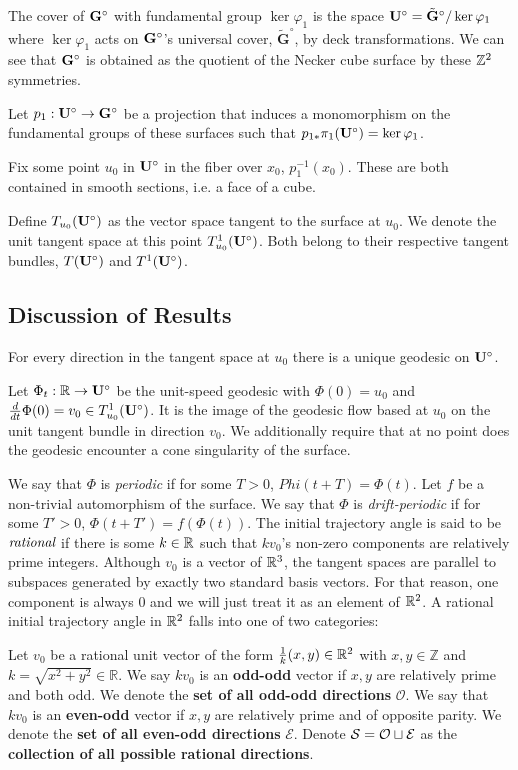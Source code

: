 \documentclass[a4paper, 11pt]{article}
\begin{document}
The cover of $\mathbf{G}^\circ$ with fundamental group $\ker\varphi_1$ is the space $\mathbf{U}^\circ=\tilde{\mathbf{G}}^\circ/\ker\varphi_1$ where $\ker\varphi_1$ acts on $\mathbf{G}^\circ$'s universal cover,  $\widetilde{\mathbf{G}}^\circ$, by deck transformations. We can see that $\mathbf{G}^\circ$ is obtained as the quotient of the Necker cube surface by these $\mathbb{Z}^2$ symmetries. 

\begin{Def}
Let $p_1:\mathbf{U}^\circ\rightarrow\mathbf{G}^\circ$ be a projection that induces a monomorphism on the fundamental groups of these surfaces such that $p_{1*}\pi_1(\mathbf{U}^\circ)=\ker\varphi_1$.
\end{Def}
Fix some point $u_0$ in $\mathbf{U}^\circ$ in the fiber over $x_0$, $p_1^{-1}(x_0)$. These are both contained in smooth sections, i.e. a face of a cube.
\begin{Def}
Define $T_{u_0}(\mathbf{U}^\circ)$ as the vector space tangent to the surface at $u_0$. We denote the unit tangent space at this point $T^1_{u_0}(\mathbf{U}^\circ)$. Both belong to their respective tangent bundles, $T(\mathbf{U}^\circ)$ and $T^1(\mathbf{U}^\circ)$.
\end{Def}

\subsection{Discussion of Results}
For every direction in the tangent space at $u_0$ there is a unique geodesic on $\mathbf{U}^\circ$.
\begin{Def}
Let $\Phi_t:\mathbb{R}\rightarrow\mathbf{U}^\circ$ be the unit-speed geodesic with $\Phi(0)=u_0$ and $\frac{d}{dt}\Phi(0)=v_0\in T^1_{u_0}(\mathbf{U}^\circ)$. It is the image of the geodesic flow based at $u_0$ on the unit tangent bundle in direction $v_0$. We additionally require that at no point does the geodesic encounter a cone singularity of the surface.
\end{Def}
We say that $\Phi$ is \emph{periodic} if for some $T>0$, $Phi(t+T)=\Phi(t)$. Let $f$ be a non-trivial automorphism of the surface. We say that $\Phi$ is \emph{drift-periodic} if for some $T'>0$, $\Phi(t+T')=f(\Phi(t))$. The initial trajectory angle is said to be $\emph{rational}$ if there is some $k\in\mathbb{R}$ such that $kv_0$'s non-zero components are relatively prime integers. Although $v_0$ is a vector of $\mathbb{R}^3$, the tangent spaces are parallel to subspaces generated by exactly two standard basis vectors. For that reason, one component is always 0 and we will just treat it as an element of $\mathbb{R}^2$. A rational initial trajectory angle in $\mathbb{R}^2$ falls into one of two categories:
\begin{Def}
Let $v_0$ be a rational unit vector of the form $\frac{1}{k}(x,y)\in\mathbb{R}^2$ with $x,y\in\mathbb{Z}$ and $k=\sqrt{x^2+y^2}\in\mathbb{R}$. We say $kv_0$ is an \textbf{odd-odd} vector if $x,y$ are relatively prime and both odd. We denote the \textbf{set of all odd-odd directions} $\mathcal{O}$. We say that $kv_0$ is an \textbf{even-odd} vector if $x,y$ are relatively prime and of opposite parity. We denote the \textbf{set of all even-odd directions} $\mathcal{E}$. Denote $\mathcal{S}=\mathcal{O}\sqcup\mathcal{E}$ as the \textbf{collection of all possible rational directions}.
\end{Def}
\end{document}

